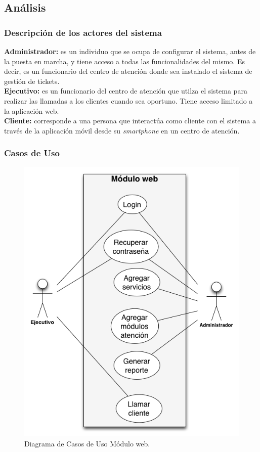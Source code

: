 \subsection{Análisis}

\subsubsection{Descripción de los actores del sistema}

\textbf{Administrador:} es un individuo que se ocupa de configurar el sistema, antes de la puesta en marcha, y tiene acceso a todas las funcionalidades del mismo. Es decir, es un funcionario del centro de atención donde sea instalado el sistema de gestión de tickets.\\

\textbf{Ejecutivo:} es un funcionario del centro de atención que utilza el sistema para realizar las llamadas a los clientes cuando sea oportuno. Tiene acceso limitado a la aplicación web.\\

\textbf{Cliente:} corresponde a una persona que interactúa como cliente con el sistema a través de la aplicación móvil desde su \textit{smartphone} en un centro de atención. \\

\subsubsection{Casos de Uso}

\begin{figure}[H]
\centering
\includegraphics[scale=0.65]{images/capitulo4/moduloWeb.png}
\caption{Diagrama de Casos de Uso Módulo web.}
\label{cuModuloWeb}
\end{figure}

